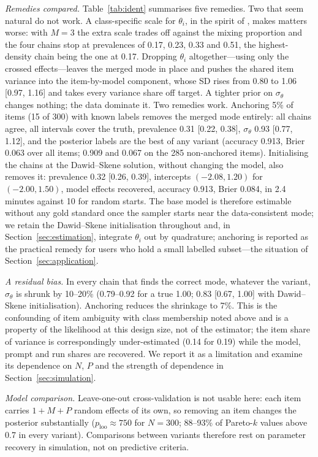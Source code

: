 \emph{Remedies compared.} Table~\ref{tab:ident} summarises five remedies. Two that seem natural do not work. A class-specific scale for $\theta_i$, in the spirit of \citet{Qu1996}, makes matters worse: with $M = 3$ the extra scale trades off against the mixing proportion and the four chains stop at prevalences of 0.17, 0.23, 0.33 and 0.51, the highest-density chain being the one at 0.17. Dropping $\theta_i$ altogether---using only the crossed effects---leaves the merged mode in place and pushes the shared item variance into the item-by-model component, whose SD rises from 0.80 to 1.06 [0.97, 1.16] and takes every variance share off target. A tighter prior on $\sigma_\theta$ changes nothing; the data dominate it. Two remedies work. Anchoring 5\% of items (15 of 300) with known labels removes the merged mode entirely: all chains agree, all intervals cover the truth, prevalence 0.31 [0.22, 0.38], $\sigma_\theta$ 0.93 [0.77, 1.12], and the posterior labels are the best of any variant (accuracy 0.913, Brier 0.063 over all items; 0.909 and 0.067 on the 285 non-anchored items). Initialising the chains at the Dawid--Skene solution, without changing the model, also removes it: prevalence 0.32 [0.26, 0.39], intercepts $(-2.08, 1.20)$ for $(-2.00, 1.50)$, model effects recovered, accuracy 0.913, Brier 0.084, in 2.4 minutes against 10 for random starts. The base model is therefore estimable without any gold standard once the sampler starts near the data-consistent mode; we retain the Dawid--Skene initialisation throughout and, in Section~\ref{sec:estimation}, integrate $\theta_i$ out by quadrature; anchoring is reported as the practical remedy for users who hold a small labelled subset---the situation of Section~\ref{sec:application}.

\emph{A residual bias.} In every chain that finds the correct mode, whatever the variant, $\sigma_\theta$ is shrunk by 10--20\% (0.79--0.92 for a true 1.00; 0.83 [0.67, 1.00] with Dawid--Skene initialisation). Anchoring reduces the shrinkage to 7\%. This is the confounding of item ambiguity with class membership noted above and is a property of the likelihood at this design size, not of the estimator; the item share of variance is correspondingly under-estimated (0.14 for 0.19) while the model, prompt and run shares are recovered. We report it as a limitation and examine its dependence on $N$, $P$ and the strength of dependence in Section~\ref{sec:simulation}.

\emph{Model comparison.} Leave-one-out cross-validation \citep{Vehtari2017} is not usable here: each item carries $1 + M + P$ random effects of its own, so removing an item changes the posterior substantially ($p_{\mathrm{loo}} \approx 750$ for $N = 300$; 88--93\% of Pareto-$k$ values above 0.7 in every variant). Comparisons between variants therefore rest on parameter recovery in simulation, not on predictive criteria.

